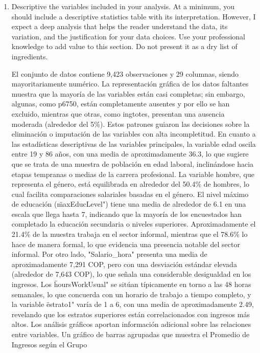 \documentclass[12pt,a4paper,onecolumn]{article}
\begin{document}
\begin{enumerate}
\begin{enumerate}
    \item Descriptive the variables included in your analysis. At a minimum, you should include a descriptive statistics table with its interpretation. However, I expect a deep analysis that helps the reader understand the data, its variation, and the justification for your data choices. Use your professional knowledge to add value to this section. Do not present it as a dry list of ingredients.

    El conjunto de datos contiene 9,423 observaciones y 29 columnas, siendo mayoritariamente num\'erico. La representaci\'on gr\'afica de los datos faltantes muestra que la mayor\'ia de las variables est\'an casi completas; sin embargo, algunas, como p6750, están completamente ausentes y por ello se han excluido, mientras que otras, como ingtotes, presentan una ausencia moderada (alrededor del 5\%). Estos patrones guiaron las decisiones sobre la eliminaci\'on o imputaci\'on de las variables con alta incompletitud. 
    En cuanto a las estad\'isticas descriptivas de las variables principales, la variable edad oscila entre 19 y 86 a\~nos, con una media de aproximadamente 36.3, lo que sugiere que se trata de una muestra de poblaci\'on en edad laboral, inclin\'andose hacia etapas tempranas o medias de la carrera profesional. La variable hombre, que representa el g\'enero, est\'a equilibrada en alrededor del 50.4\% de hombres, lo cual facilita comparaciones salariales basadas en el g\'enero. El nivel m\'aximo de educaci\'on (\"maxEducLevel") tiene una media de alrededor de 6.1 en una escala que llega hasta 7, indicando que la mayor\'ia de los encuestados han completado la educaci\'on secundaria o niveles superiores. Aproximadamente el 21.4\% de la muestra trabaja en el sector informal, mientras que el 78.6\% lo hace de manera formal, lo que evidencia una presencia notable del sector informal. Por otro lado, "Salario\_hora" presenta una media de aproximadamente 7,291 COP, pero con una desviaci\'on est\'andar elevada (alrededor de 7,643 COP), lo que se\~nala una considerable desigualdad en los ingresos. Los \"hoursWorkUsual" se sit\'uan t\'ipicamente en torno a las 48 horas semanales, lo que concuerda con un horario de trabajo a tiempo completo, y la variable \"estrato1" varía de 1 a 6, con una media de aproximadamente 2.49, revelando que los estratos superiores est\'an correlacionados con ingresos m\'as altos. Los an\'alisis gr\'aficos aportan informaci\'on adicional sobre las relaciones entre variables. Un gr\'afico de barras agrupadas que muestra el Promedio de Ingresos seg\'un el Grupo









\end{enumerate}
\end{enumerate}
\end{document}
